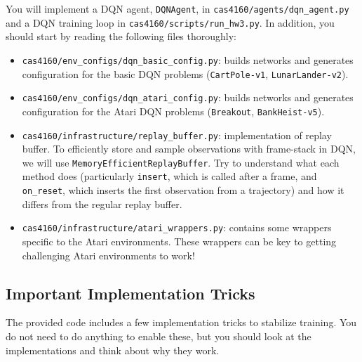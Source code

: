 \documentclass{article}
\begin{document}
You will implement a DQN agent, \verb|DQNAgent|, in \verb|cas4160/agents/dqn_agent.py| and a DQN training loop in \verb|cas4160/scripts/run_hw3.py|. In addition, you should start by reading the following files thoroughly:
\begin{itemize}
    \item \verb|cas4160/env_configs/dqn_basic_config.py|: builds networks and generates configuration for the basic DQN problems (\verb|CartPole-v1|, \verb|LunarLander-v2|).
    \item \verb|cas4160/env_configs/dqn_atari_config.py|: builds networks and generates configuration for the Atari DQN problems (\verb|Breakout|, \verb|BankHeist-v5|).
    \item \verb|cas4160/infrastructure/replay_buffer.py|: implementation of replay buffer. To efficiently store and sample observations with frame-stack in DQN, we will use \verb|MemoryEfficientReplayBuffer|. Try to understand what each method does (particularly \verb|insert|, which is called after a frame, and \verb|on_reset|, which inserts the first observation from a trajectory) and how it differs from the regular replay buffer.
    \item \verb|cas4160/infrastructure/atari_wrappers.py|: contains some wrappers specific to the Atari environments. These wrappers can be key to getting challenging Atari environments to work!
\end{itemize}


\subsection{Important Implementation Tricks}

The provided code includes a few implementation tricks to stabilize training. You do not need to do anything to enable these, but you should look at the implementations and think about why they work.
\end{document}
